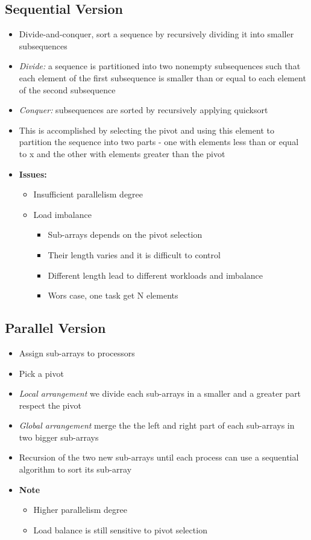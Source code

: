 \documentclass[12pt,oneside]{report}
\begin{document}
\subsection{Sequential Version}
\begin{itemize}
    \item Divide-and-conquer, sort a sequence by recursively dividing it into smaller subsequences
    \item \textit{Divide:} a sequence is partitioned into two nonempty subsequences such that each element of the first subsequence is smaller than or equal to each element of the second subsequence
    \item \textit{Conquer:} subsequences are sorted by recursively applying quicksort
    \item This is accomplished by selecting the pivot and using this element to partition the sequence into two parts - one with elements less than or equal to x and the other with elements greater than the pivot
    \item \textbf{Issues:}
    \begin{itemize}
        \item Insufficient parallelism degree
        \item Load imbalance
        \begin{itemize}
            \item Sub-arrays depends on the pivot selection
            \item Their length varies and it is difficult to control
            \item Different length lead to different workloads and imbalance
            \item Wors case, one task get N elements
        \end{itemize}
    \end{itemize}
\end{itemize}

\subsection{Parallel Version}
\begin{itemize}
    \item Assign sub-arrays to processors
    \item Pick a pivot
    \item \textit{Local arrangement} we divide each sub-arrays in a smaller and a greater part respect the pivot
    \item \textit{Global arrangement} merge the the left and right part of each sub-arrays in two bigger sub-arrays
    \item Recursion of the two new sub-arrays until each process can use a sequential algorithm to sort its sub-array
    \item \textbf{Note}
    \begin{itemize}
        \item Higher parallelism degree
        \item Load balance is still sensitive to pivot selection 
    \end{itemize}
\end{itemize}
\end{document}
